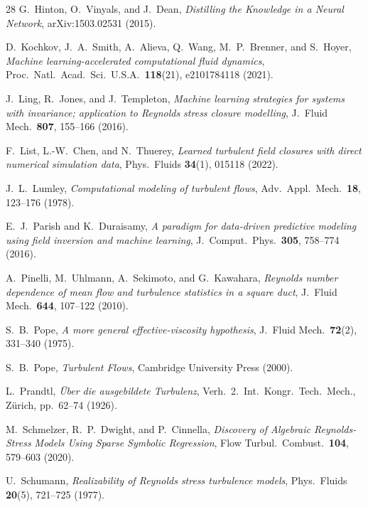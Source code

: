 \documentclass[preprint,aps,prb,longbibliography,superscriptaddress]{revtex4-2}
\begin{document}
\begin{thebibliography}{28}
  G.~Hinton, O.~Vinyals, and J.~Dean,
  \emph{Distilling the Knowledge in a Neural Network},
  arXiv:1503.02531 (2015).

  D.~Kochkov, J.~A.~Smith, A.~Alieva, Q.~Wang, M.~P.~Brenner, and S.~Hoyer,
  \emph{Machine learning-accelerated computational fluid dynamics},
  Proc.\ Natl.\ Acad.\ Sci.\ U.S.A.\ \textbf{118}(21), e2101784118 (2021).

  J.~Ling, R.~Jones, and J.~Templeton,
  \emph{Machine learning strategies for systems with invariance; application to Reynolds stress closure modelling},
  J.\ Fluid Mech.\ \textbf{807}, 155--166 (2016).

  F.~List, L.-W.~Chen, and N.~Thuerey,
  \emph{Learned turbulent field closures with direct numerical simulation data},
  Phys.\ Fluids \textbf{34}(1), 015118 (2022).

  J.~L.~Lumley,
  \emph{Computational modeling of turbulent flows},
  Adv.\ Appl.\ Mech.\ \textbf{18}, 123--176 (1978).

  E.~J.~Parish and K.~Duraisamy,
  \emph{A paradigm for data-driven predictive modeling using field inversion and machine learning},
  J.\ Comput.\ Phys.\ \textbf{305}, 758--774 (2016).

  A.~Pinelli, M.~Uhlmann, A.~Sekimoto, and G.~Kawahara,
  \emph{Reynolds number dependence of mean flow and turbulence statistics in a square duct},
  J.\ Fluid Mech.\ \textbf{644}, 107--122 (2010).

  S.~B.~Pope,
  \emph{A more general effective-viscosity hypothesis},
  J.\ Fluid Mech.\ \textbf{72}(2), 331--340 (1975).

  S.~B.~Pope,
  \emph{Turbulent Flows},
  Cambridge University Press (2000).

  L.~Prandtl,
  \emph{\"Uber die ausgebildete Turbulenz},
  Verh.\ 2.\ Int.\ Kongr.\ Tech.\ Mech., Z\"urich, pp.~62--74 (1926).

  M.~Schmelzer, R.~P.~Dwight, and P.~Cinnella,
  \emph{Discovery of Algebraic Reynolds-Stress Models Using Sparse Symbolic Regression},
  Flow Turbul.\ Combust.\ \textbf{104}, 579--603 (2020).

  U.~Schumann,
  \emph{Realizability of Reynolds stress turbulence models},
  Phys.\ Fluids \textbf{20}(5), 721--725 (1977).


\end{thebibliography}
\end{document}
